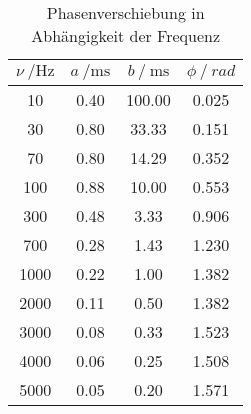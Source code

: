 \begin{table}[H]
  \centering
  \caption{Phasenverschiebung in Abhängigkeit der Frequenz}
  \label{tab:tabe3}
    \begin{tabular}{c c c c}
    \toprule
    $ \nu \: / \si{\hertz} $ & $ a \: / \si {\milli \second} $ & $ b \:
     / \: \si{\milli \second} $
    & $ \phi \: / \: rad $ \\
    \midrule
    10 & 0.40 & 100.00 & 0.025 \\
    30 & 0.80 & 33.33 & 0.151 \\
    70 & 0.80 & 14.29 & 0.352 \\
    100 & 0.88 & 10.00 & 0.553\\
    300 & 0.48 & 3.33 & 0.906\\
    700 & 0.28 & 1.43 & 1.230\\
    1000 & 0.22 & 1.00 & 1.382\\
    2000 & 0.11 & 0.50 & 1.382\\
    3000 & 0.08 & 0.33 & 1.523\\
    4000 & 0.06 & 0.25 & 1.508\\
    5000 & 0.05 & 0.20 & 1.571\\

      \bottomrule
    \end{tabular}
\end{table}
